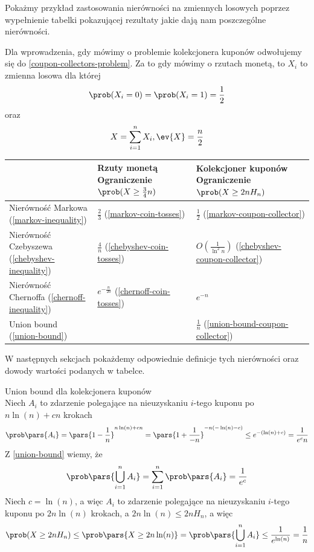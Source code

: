 Pokażmy przykład zastosowania nierówności na zmiennych losowych poprzez wypełnienie tabelki pokazującej rezultaty jakie dają nam poszczególne nierówności.

Dla wprowadzenia, gdy mówimy o problemie kolekcjonera kuponów odwołujemy się do \ref{coupon-collectors-problem}. Za to gdy mówimy o rzutach monetą, to \(X_i\) to zmienna losowa dla której
\[
	\prob(X_i = 0) = \prob(X_i = 1) = \frac{1}{2}
\]
oraz
\[
	X = \sum_{i=1}^n X_i, \ev{X} = \frac{n}{2}
\]

\begin{tabular}{p{6cm} p{5.5cm} p{5.5cm}}
	\toprule
	                                                   & Rzuty monetą \newline Ograniczenie \(\prob(X \geq \frac{3}{4}n)\) & Kolekcjoner kuponów \newline Ograniczenie \(\prob(X \geq 2 n H_n)\) \\
	\midrule
	Nierówność Markowa (\ref{markov-inequality})       & \(\frac{2}{3}\) (\ref{markov-coin-tosses})                        & \(\frac{1}{2}\) (\ref{markov-coupon-collector})                     \\

	Nierówność Czebyszewa (\ref{chebyshev-inequality}) & \(\frac{4}{n}\) (\ref{chebyshev-coin-tosses})                     & \(O(\frac{1}{\ln^2 n})\) (\ref{chebyshev-coupon-collector})         \\

	Nierówność Chernoffa (\ref{chernoff-inequality})   & \(e^{-\frac{n}{20}}\) (\ref{chernoff-coin-tosses})                & \(e^{-n}\)                                                          \\

	Union bound (\ref{union-bound})                    & \(\)                                                              & \(\frac{1}{n}\) (\ref{union-bound-coupon-collector})                \\
	\bottomrule
\end{tabular}

W następnych sekcjach pokażdemy odpowiednie definicje tych nierówności oraz dowody wartości podanych w tabelce.

\begin{example} Union bound dla kolekcjonera kuponów\\
	\label{union-bound-coupon-collector}
	Niech \(A_i\) to zdarzenie polegające na nieuzyskaniu \(i\)-tego kuponu po \(n \ln(n) + cn\) krokach
	\[
		\prob\pars{A_i} = \pars{1 - \frac{1}{n}}^{n \ln(n) + cn} = \pars{1 + \frac{1}{-n}}^{-n(-\ln(n) -c)} \leq e^{-(\ln(n) + c)} = \frac{1}{e^c n}
	\]
	Z \ref{union-bound} wiemy, że
	\[
		\prob\pars{\bigcup_{i=1}^n A_i} = \sum_{i=1}^n \prob\pars{A_i} = \frac{1}{e^c}
	\]
	Niech \(c = \ln(n)\), a więc \(A_i\) to zdarzenie polegające na nieuzyskaniu \(i\)-tego kuponu po \(2n \ln(n)\) krokach, a \(2n \ln(n) \leq 2n H_n\), a więc
	\[
		\prob(X \geq 2n H_n) \leq \prob\pars{X \geq 2n \ln(n)} = \prob\pars{\bigcup_{i=1}^n A_i} \leq \frac{1}{e^{\ln(n)}} = \frac{1}{n}
	\]
\end{example}